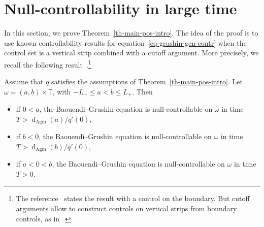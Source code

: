 \documentclass[AHL,Unicode,longabstracts,published]{cedram}
\renewcommand{\leq}{\leqslant}
\newcommand{\1}{\mathds 1}
\newcommand{\dagmon}{\mathop{\mathrm{d}}\nolimits_{\mathrm{Agm}}}
\newcommand{\T}{\mathbb{T}}
\renewcommand{\o}{\omega}
\renewcommand{\o}{\omega}
\begin{document}
\section{Null-controllability in large time} \label{sec_positive_result}

In this section, we prove Theorem~\ref{th-main-pos-intro}. The idea of the proof is to use known controllability results for equation~\eqref{eq-grushin-gen-contr} when the control set is a vertical strip combined with a cutoff argument. More precisely, we recall the following result~\cite[Theorem~1.4]{BDE20}.\footnote{The reference~\cite{BDE20} states the result with a control on the boundary. But cutoff arguments allow to construct controls on vertical strips from boundary controls, as in~\cite[Appendix A]{DK20}.}

\begin{prop}\label{prop_control_vertical_strip}
Assume that $q$ satisfies the assumptions of Theorem~\ref{th-main-pos-intro}. Let $\omega = (a,b)\times \T$, with $-L_- \leq a < b \leq L_+$. Then
\begin{itemize}
\item if $0< a$, the Baouendi--Grushin equation is null-controllable on $\o$ in time $T> \dagmon(a)/q'(0)$,
\item if $b< 0$, the Baouendi--Grushin equation is null-controllable on $\o$ in time $T> \dagmon(b)/q'(0)$,
\item if $a<0<b$, the Baouendi--Grushin equation is null-controllable on $\o$ in time $T>0$.
\end{itemize}
\end{prop}
\end{document}
